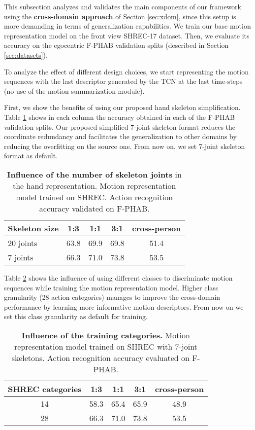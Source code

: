 \documentclass[letterpaper, 10 pt, conference]{ieeeconf}
\begin{document}
This subsection analyzes and validates the main components of our framework using the \textbf{cross-domain approach} of Section \ref{sec:xdom}, since this setup is more demanding in terms of generalization capabilities.
We train our base motion representation model on the front view SHREC-17 dataset.
Then, we evaluate its accuracy on the egocentric F-PHAB validation splits (described in Section \ref{sec:datasets}).

To analyze the effect of different design choices, we start representing the motion sequences with the last descriptor generated by the TCN at the last time-steps (no use of the motion summarization module).

First, we show the benefits of using our proposed hand skeleton simplification. 
Table \ref{tab:skel_size} shows in each column the accuracy obtained in each of the F-PHAB validation splits.
Our proposed simplified 7-joint skeleton format reduces the coordinate redundancy and facilitates the generalization to other domains by reducing the overfitting on the source one. From now on, we set 7-joint skeleton format as default.

\begin{table}[!htb]
\centering
\begin{tabular}{|l|c|c|c|c|}
\hline
\textbf{Skeleton size} & \textbf{1:3} & \textbf{1:1} & \textbf{3:1} & \textbf{cross-person} \\ \hline
20 joints & 63.8 & 69.9 & 69.8 & 51.4 \\ \hline
7 joints & 66.3 & 71.0 & 73.8 & 53.5 \\ \hline
\end{tabular}
\caption{\textbf{Influence of the number of skeleton joints} in the hand representation. Motion representation model trained on SHREC. Action recognition accuracy validated on F-PHAB. }
\label{tab:skel_size}
\end{table}



Table \ref{tab:train_labels} shows the influence of using different classes to discriminate motion sequences while training the motion representation model.
Higher class granularity (28 action categories) manages to improve the cross-domain performance by learning more informative motion descriptors. From now on we set this class granularity as default for training.

\begin{table}[!htb]
\centering
\begin{tabular}{|c|c|c|c|c|}
\hline
\textbf{SHREC categories} & \textbf{1:3} & \textbf{1:1} & \textbf{3:1} & \textbf{cross-person} \\ \hline
14 & 58.3 & 65.4 & 65.9 & 48.9 \\ \hline
28 & 66.3 & 71.0 & 73.8 & 53.5 \\ \hline
\end{tabular}
\caption{\textbf{Influence of the training categories.} Motion representation model trained on SHREC with 7-joint skeletons. Action recognition accuracy evaluated on F-PHAB.}
\label{tab:train_labels}
\end{table}
\end{document}
